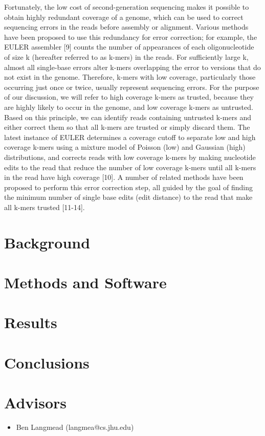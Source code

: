 \documentclass[11pt]{article}
\begin{document}
Fortunately, the low cost of second-generation sequencing makes it possible to obtain highly redundant coverage of a genome, which can be used to correct sequencing errors in the reads before assembly or alignment. Various methods have been proposed to use this redundancy for error correction; for example, the EULER assembler [9] counts the number of appearances of each oligonucleotide of size k (hereafter referred to as k-mers) in the reads. For sufficiently large k, almost all single-base errors alter k-mers overlapping the error to versions that do not exist in the genome. Therefore, k-mers with low coverage, particularly those occurring just once or twice, usually represent sequencing errors. For the purpose of our discussion, we will refer to high coverage k-mers as trusted, because they are highly likely to occur in the genome, and low coverage k-mers as untrusted. Based on this principle, we can identify reads containing untrusted k-mers and either correct them so that all k-mers are trusted or simply discard them. The latest instance of EULER determines a coverage cutoff to separate low and high coverage k-mers using a mixture model of Poisson (low) and Gaussian (high) distributions, and corrects reads with low coverage k-mers by making nucleotide edits to the read that reduce the number of low coverage k-mers until all k-mers in the read have high coverage [10]. A number of related methods have been proposed to perform this error correction step, all guided by the goal of finding the minimum number of single base edits (edit distance) to the read that make all k-mers trusted [11-14].



\section{Background}

\section{Methods and Software}

\section{Results}

\section{Conclusions}

\section{Advisors}
\begin{itemize}
	\item Ben Langmead (langmea@cs.jhu.edu)
\end{itemize}


\nocite{*}


\end{document}
